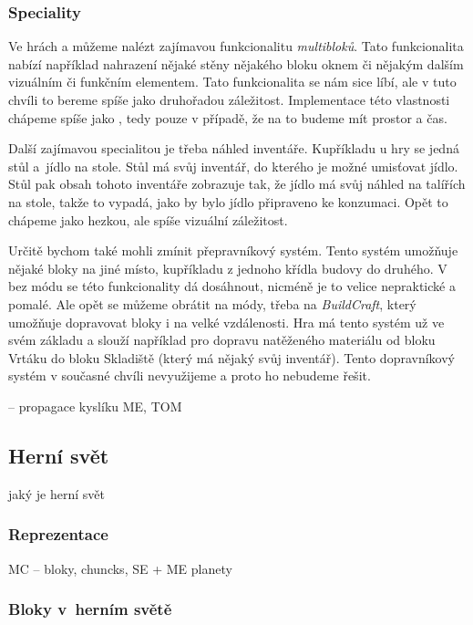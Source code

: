 \subsubsection{Speciality}
Ve hrách \ME{} a  \NMS{} můžeme nalézt zajímavou funkcionalitu \textit{multibloků}. Tato funkcionalita nabízí například nahrazení nějaké stěny nějakého bloku oknem či nějakým dalším vizuálním či funkčním elementem. Tato funkcionalita se nám sice líbí, ale v tuto chvíli to bereme spíše jako druhořadou záležitost. Implementace této vlastnosti chápeme spíše jako , tedy pouze v případě, že na to budeme mít prostor a čas.

Další zajímavou specialitou je třeba náhled inventáře. Kupříkladu u hry \ME{} se jedná stůl a~jídlo na stole. Stůl má svůj inventář, do kterého je možné umisťovat jídlo. Stůl pak obsah tohoto inventáře zobrazuje tak, že jídlo má svůj náhled na talířích na stole, takže to vypadá, jako by bylo jídlo připraveno ke konzumaci. Opět to chápeme jako hezkou, ale spíše vizuální záležitost.

Určitě bychom také mohli zmínit přepravníkový systém. Tento systém umožňuje  nějaké bloky na jiné místo, kupříkladu z jednoho křídla budovy do druhého. V  bez módu se této funkcionality dá dosáhnout, nicméně je to velice nepraktické a pomalé. Ale opět se můžeme obrátit na módy, třeba na \textit{BuildCraft}, který umožňuje dopravovat bloky i na velké vzdálenosti. Hra \SE{} má tento systém už ve svém základu a slouží například pro dopravu natěženého materiálu od bloku Vrtáku do bloku Skladiště (který má nějaký svůj inventář). Tento dopravníkový systém v současné chvíli nevyužijeme a proto ho nebudeme řešit.

-- propagace kyslíku ME, TOM

\subsection{Herní svět}

jaký je herní svět

\subsubsection{Reprezentace}

MC -- bloky, chuncks, SE + ME planety

\subsubsection{Bloky v~herním světě}

